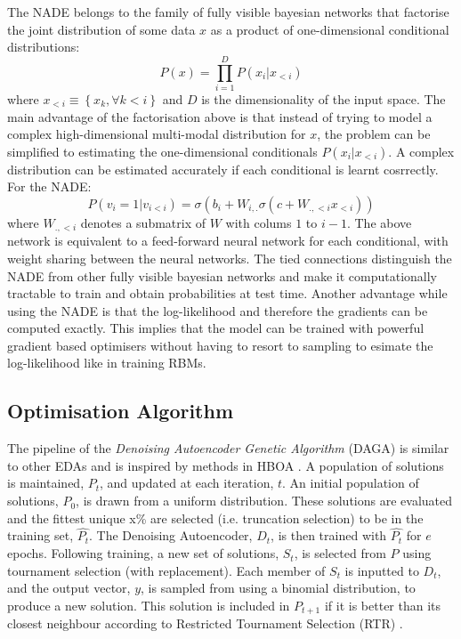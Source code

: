 \documentclass[twoside]{article}
\begin{document}
The NADE belongs to the family of fully visible bayesian networks that factorise the joint distribution of some data $x$ as a product of one-dimensional conditional distributions:
$$ P(x) = \prod_{i=1}^{D} P(x_i|x_{<i})$$ where $x_{<i} \equiv \left\{ x_k, \forall k < i \right\} $  and $D$ is the dimensionality of the input space. The main advantage of the factorisation above is that instead of trying to model a complex high-dimensional multi-modal distribution for $x$, the problem can be simplified to estimating the one-dimensional conditionals $P(x_i|x_{<i})$. A complex distribution can be estimated accurately if each conditional is learnt cosrrectly. For the NADE: 
$$P(v_i=1|v_{i<i}) =  \sigma(b_i + W_{i,.}\sigma(c+W_{.,<i}x_{<i}))$$ where $W_{.,<i}$ denotes a submatrix of $W$ with colums $1$ to $i-1$. 
The above network is equivalent to a feed-forward neural network for each conditional, with weight sharing between the neural networks. The tied connections distinguish the NADE from other fully visible bayesian networks and make it computationally tractable to train and obtain probabilities at test time. Another advantage while using the NADE is that the log-likelihood and therefore the gradients can be computed exactly. This implies that the model can be trained with powerful gradient based optimisers without having to resort to sampling to esimate the log-likelihood like in training RBMs. 


\subsection{Optimisation Algorithm}

The pipeline of the \emph{Denoising Autoencoder Genetic Algorithm} (DAGA) is similar to other EDAs and is inspired by methods in HBOA \cite{hboa}. A population of solutions is maintained, \(P_t\), and updated at each iteration, \(t\). An initial population of solutions, \(P_0\), is drawn from a uniform distribution. These solutions are evaluated and the fittest unique x\% are selected (i.e. truncation selection) to be in the training set, \(\hat{P_t}\). The Denoising Autoencoder, \(D_t\), is then trained with \(\hat{P_t}\) for \(e\) epochs. Following training, a new set of solutions, \(S_t\), is selected from \(P\) using tournament selection (with replacement). Each member of \(S_t\) is inputted to \(D_t\), and the output vector, \(y\), is sampled from using a binomial distribution, to produce a new solution. This solution is included in \(P_{t+1}\) if it is better than its closest neighbour according to Restricted Tournament Selection (RTR) \cite{hboa}.
\end{document}
